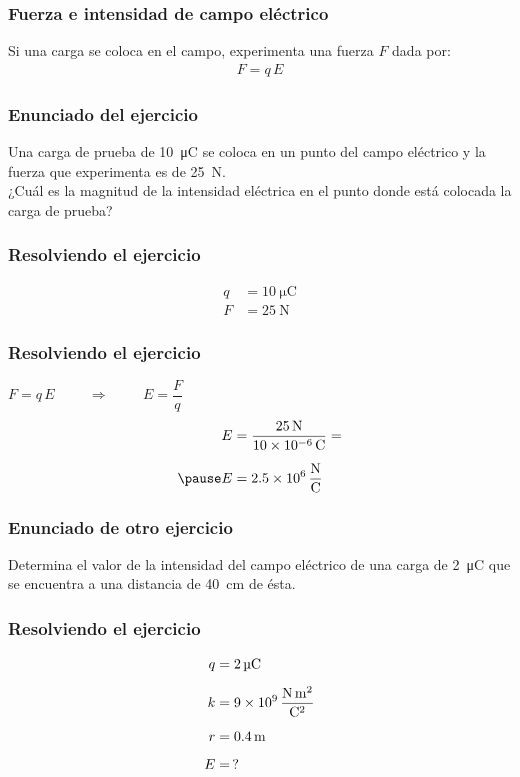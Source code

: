 \documentclass[14pt]{beamer}
\begin{document}
\begin{frame}
\frametitle{Fuerza e intensidad de campo eléctrico}
Si una carga se coloca en el campo, experimenta una fuerza $F$ dada por:
\pause
\begin{align*}
F = q \, E
\end{align*}
\end{frame}
\begin{frame}
\frametitle{Enunciado del ejercicio}
Una carga de prueba de \SI{10}{\micro\coulomb} se coloca en un punto del campo eléctrico y la fuerza que experimenta es de \SI{25}{\newton}.
\\
\bigskip
\pause
¿Cuál es la magnitud de la intensidad eléctrica en el punto donde está colocada la carga de prueba?
\end{frame}
\begin{frame}
\frametitle{Resolviendo el ejercicio}
\begin{align*}
q &= \SI{10}{\micro\coulomb} \\[0.5em]
F &= \SI{25}{\newton}
\end{align*}
\end{frame}
\begin{frame}
\frametitle{Resolviendo el ejercicio}
 \pause $F = q \, E \hspace{1cm} \Rightarrow \hspace{1cm} E = \dfrac{F}{q}$ \\[0.5em] \pause
{} 
\begin{eqnarray*}
\begin{aligned}
E &= \dfrac{\SI{25}{\newton}}{\SI{10d-6}{\coulomb}} = \\[0.5em] \pause 
E &= \SI[per-mode=fraction]{2.5d6}{\newton\per\coulomb}
\end{aligned}
\end{eqnarray*}
\end{frame}
\begin{frame}
\frametitle{Enunciado de otro ejercicio}
Determina el valor de la intensidad del campo eléctrico de una carga de \SI{2}{\micro\coulomb} que se encuentra a una distancia de \SI{40}{\centi\meter} de ésta.
\end{frame}
\begin{frame}
\frametitle{Resolviendo el ejercicio}
\begin{align*}
q &= \SI{2}{\micro\coulomb} \\[0.5em]
k &= \SI[per-mode=fraction]{9d9}{\newton\square\meter\per\square\coulomb} \\[0.5em]
r &= \SI{0.4}{\meter} \\[0.5em]
E &= \, ?
\end{align*}
\end{frame}
\end{document}
